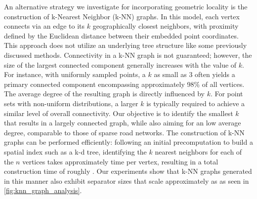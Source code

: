 An alternative strategy we investigate for incorporating geometric locality is the construction of k-Nearest Neighbor (k-NN) graphs.
In this model, each vertex connects via an edge to its \(k\) geographically closest neighbors, with proximity defined by the Euclidean distance between their embedded point coordinates.
This approach does not utilize an underlying tree structure like some previously discussed methods.
Connectivity in a k-NN graph is not guaranteed; however, the size of the largest connected component generally increases with the value of \(k\).
For instance, with uniformly sampled points, a \(k\) as small as 3 often yields a primary connected component encompassing approximately 98\% of all vertices.
The average degree of the resulting graph is directly influenced by \(k\).
For point sets with non-uniform distributions, a larger \(k\) is typically required to achieve a similar level of overall connectivity.
Our objective is to identify the smallest \(k\) that results in a largely connected graph, while also aiming for an low average degree, comparable to those of sparse road networks.
The construction of k-NN graphs can be performed efficiently: following an initial  precomputation to build a spatial index such as a k-d tree, identifying the \(k\) nearest neighbors for each of the \(n\) vertices takes approximately  time per vertex, resulting in a total construction time of roughly .
Our experiments show that k-NN graphs generated in this manner also exhibit separator sizes that scale approximately as  as seen in \cref{fig:knn_graph_analysis}.

